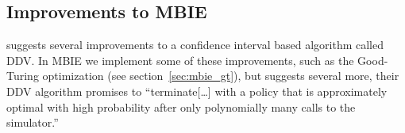 \subsection{Improvements to MBIE}

\textcite{dietterich2013pac} suggests several improvements to a confidence interval based algorithm called DDV. 
In MBIE we implement some of these improvements, such as the Good-Turing optimization (see section~\ref{sec:mbie_gt}), 
but \textcite{dietterich2013pac} suggests several more, their DDV algorithm promises to ``terminate[\ldots] with a policy that is approximately optimal 
with high probability after only polynomially many calls to the simulator.''
